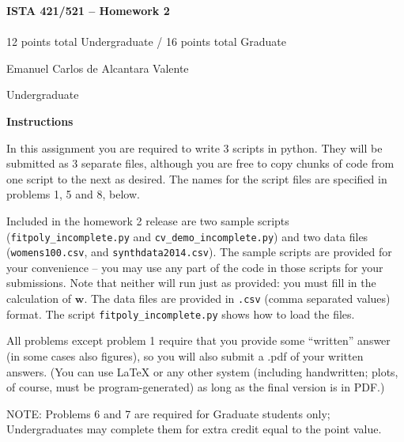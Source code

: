 \documentclass[10pt]{article}
\newcommand{\latex}{\LaTeX\xspace}
\begin{document}
\begin{center}
    {\Large {\bf ISTA 421/521 -- Homework 2}} \\
     \\
    12 points total Undergraduate / 16 points total Graduate
\end{center}

\begin{flushright}
Emanuel Carlos de Alcantara Valente %

Undergraduate %
\end{flushright}

\vspace{1cm}
{\Large {\bf Instructions}}

In this assignment you are required to write 3 scripts in python.  They will be submitted as 3 separate files, although you are free to copy chunks of code from one script to the next as desired.  The names for the script files are specified in problems 1, 5 and 8, below.

Included in the homework 2 release are two sample scripts ({\tt fitpoly\_incomplete.py} and {\tt cv\_demo\_incomplete.py}) and two data files ({\tt womens100.csv}, and {\tt synthdata2014.csv}).  The sample scripts are provided for your convenience -- you may use any part of the code in those scripts for your submissions.  Note that neither will run just as provided: you must fill in the calculation of $\mathbf{w}$.  The data files are provided in {\tt .csv} (comma separated values) format.  The script {\tt fitpoly\_incomplete.py} shows how to load the files.

All problems except problem 1 require that you provide some ``written'' answer (in some cases also figures), so you will also submit a .pdf of your written answers.  (You can use \latex or any other system (including handwritten; plots, of course, must be program-generated) as long as the final version is in PDF.)


NOTE: Problems 6 and 7 are required for Graduate students only; Undergraduates may complete them for extra credit equal to the point value.
\end{document}
